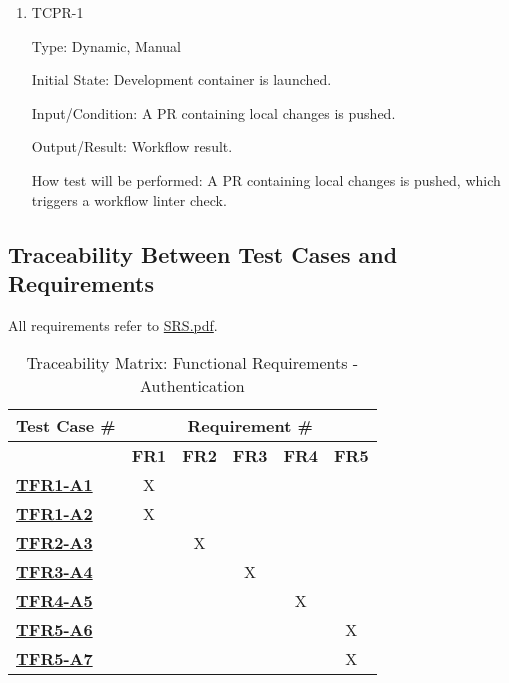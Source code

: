 \documentclass[12pt, titlepage]{article}
\begin{document}
\begin{enumerate}
\item{TCPR-1\\}\label{TCPR-1}

Type: Dynamic, Manual
					
Initial State: Development container is launched.
					
Input/Condition: A PR containing local changes is pushed.
					
Output/Result: Workflow result.
					
How test will be performed: A PR containing local changes is pushed, which triggers a workflow linter check.
\end{enumerate}
\clearpage %
\begin{landscape}
    \pagestyle{empty}%
\subsection{Traceability Between Test Cases and Requirements}
All requirements refer to \href{https://github.com/wangq131/4G06CapstoneProjectT5/blob/689841fefc298f80d84232996e1c7ca7981dd93d/docs/SRS/SRS.pdf}{SRS.pdf}.
\begin{table}[H]
    \centering
    \begin{adjustbox}{width=1\textwidth}
    \begin{tabular}{l|ccccc}
        \textbf{Test Case \#} & \multicolumn{5}{c}{\textbf{Requirement \#}}\\
        \hline
        ~ & \textbf{FR1} & \textbf{FR2} & \textbf{FR3} & \textbf{FR4} & \textbf{FR5} \\
        \hyperref[TFR1-A1] \textbf{TFR1-A1}  & X & ~ & ~ & ~ & ~ \\
        \hyperref[TFR1-A2] \textbf{TFR1-A2}  & X & ~ & ~ & ~ & ~ \\
        \hyperref[TFR2-A3] \textbf{TFR2-A3}  & ~ & X & ~ & ~ & ~ \\
        \hyperref[TFR3-A4] \textbf{TFR3-A4}  & ~ & ~ & X & ~ & ~ \\
        \hyperref[TFR4-A5] \textbf{TFR4-A5}  & ~ & ~ & ~ & X & ~ \\
        \hyperref[TFR5-A6] \textbf{TFR5-A6}  & ~ & ~ & ~ & ~ & X \\
        \hyperref[TFR5-A7] \textbf{TFR5-A7}  & ~ & ~ & ~ & ~ & X \\
    \end{tabular}
    \end{adjustbox}
    \caption{Traceability Matrix: Functional Requirements - Authentication}
    \label{table:TraceabilityMatrix}
\end{table}


\end{landscape}
\end{document}
